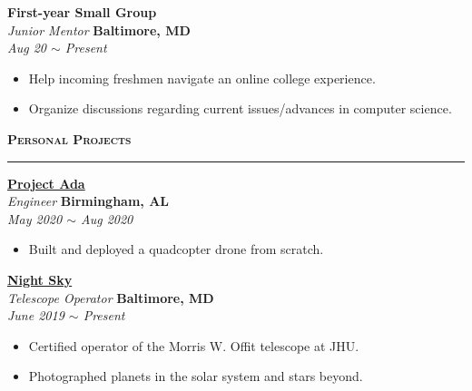 \documentclass[10pt, letterpaper]{article}
\begin{document}
\begin{paracol}{2}
	\textbf{First-year Small Group}\\
	\textit{Junior Mentor}
	\switchcolumn
	\raggedleft\textbf{Baltimore, MD}\\
	\raggedleft\textit{Aug 20 $\sim$ Present}
\end{paracol}\vspace{-1mm}
\vspace{-2mm}
\begin{itemize}
	\item Help incoming freshmen navigate an online college experience.
	\vspace{-3mm}
	\item Organize discussions regarding current issues/advances in computer science.
\end{itemize}

{\large \textbf{\textsc{Personal Projects}}}
\vspace{5pt}
\hrule

\begin{paracol}{2}
	\textbf{\href{https://ugrad.cs.jhu.edu/~czhu26/new_sub/projects/drone.html}{Project Ada}}\\
	\textit{Engineer}
	\switchcolumn
	\raggedleft\textbf{Birmingham, AL}\\
	\raggedleft\textit{May 2020 $\sim$ Aug 2020}
\end{paracol}\vspace{-1mm}
\vspace{-2mm}
\begin{itemize}
	\item Built and deployed a quadcopter drone from scratch.
\end{itemize}
\vspace{-2mm}

\begin{paracol}{2}
	\textbf{\href{https://ugrad.cs.jhu.edu/~czhu26/new_sub/projects/observatory.html}{Night Sky}}\\
	\textit{Telescope Operator}
	\switchcolumn
	\raggedleft\textbf{Baltimore, MD}\\
	\raggedleft\textit{June 2019 $\sim$ Present}
\end{paracol}\vspace{-1mm}
\vspace{-2mm}
\begin{itemize}
	\item Certified operator of the Morris W. Offit telescope at JHU.
	\vspace{-3mm}
	\item Photographed planets in the solar system and stars beyond.
\end{itemize}
\end{document}
